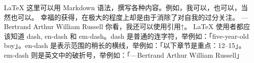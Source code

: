 \markdownRendererInterblockSeparator
{}\markdownRendererBackslash{}LaTeX 这里可以用 Markdown 语法，撰写各种内容。例如，我可以，也可以，当然也可以。\markdownRendererInterblockSeparator
{}\markdownRendererInterblockSeparator
{}\markdownRendererBlockQuoteBegin
幸福的获得，在极大的程度上却是由于消除了对自我的过分关注。 ---Bertrand Arthur William Russell
\markdownRendererBlockQuoteEnd \markdownRendererInterblockSeparator
{}你看，我还可以使用引用↑。\markdownRendererInterblockSeparator
{}\markdownRendererInterblockSeparator
{}LaTeX 使用者都应该知道 dash, en-dash 和 em-dash。dash 是普通的连字符，举例如：「five-year-old boy」。en-dash 是表示范围的稍长的横线，举例如：「以下章节是重点：12--15」。em-dash 则是英文中的破折号，举例如：「---Bertrand Arthur William Russell」\relax